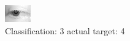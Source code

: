 \begin{figure}[h!]
\begin{center}
\includegraphics[width=0.60\columnwidth]{figures/ID2599_class_3_target_4.png}
\end{center}
\caption{ Classification: 3 actual target: 4}
\label{fig:ID2599_class_3_target_4}
\end{figure}
